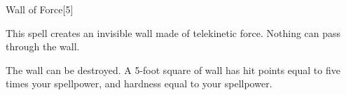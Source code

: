 \begin{spellsection}{Wall of Force}[5]
    \begin{spellheader}
    \end{spellheader}
    \begin{spellcontent}
        \begin{spelltargetinginfo}
        \end{spelltargetinginfo}
        \begin{spelleffects}
            \spelleffect This spell creates an invisible wall made of telekinetic force. Nothing can pass through the wall.
            \spelldur \durshort \dismissable
        \end{spelleffects}
    \end{spellcontent}
    \begin{spellfooter}
        \spellnotes The wall can be destroyed. A 5-foot square of wall has hit points equal to five times your spellpower, and hardness equal to your spellpower.

        \miscastexplode
    \end{spellfooter}
\end{spellsection}

